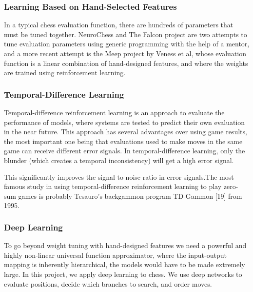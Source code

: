 			\subsubsection{Learning Based on Hand-Selected Features}
			
			In a typical chess evaluation function, there are hundreds of parameters that must be tuned together. NeuroChess and The Falcon project are two attempts to tune evaluation parameters using generic programming with the help of a mentor, and a more recent attempt is the Meep project by Veness et al, whose evaluation function is a linear combination of hand-designed features, and where the weights are trained using reinforcement learning.
			
			\subsubsection{Temporal-Difference Learning}
			
			Temporal-difference reinforcement learning is an approach to evaluate the performance of models, where systems are  tested to predict their own evaluation in the near future.
			This approach has several advantages over using game results, the most important one being that evaluations used to make moves in the same game can receive different error signals.
			In temporal-difference learning, only the blunder (which creates a temporal inconsistency) will get a high error signal. 
			
			This significantly improves the signal-to-noise ratio in error signals.The most famous study in using temporal-difference reinforcement learning to play zero-sum games is probably Tesauro's backgammon program TD-Gammon [19] from 1995.
			
			\subsubsection{Deep Learning}
			To go beyond weight tuning with hand-designed features we need a powerful and highly non-linear universal function approximator, where the input-output mapping is inherently hierarchical, the models would have to be made extremely large.
			In this project, we apply deep learning to chess. We use deep networks to evaluate positions, decide which branches to search, and order moves.
	